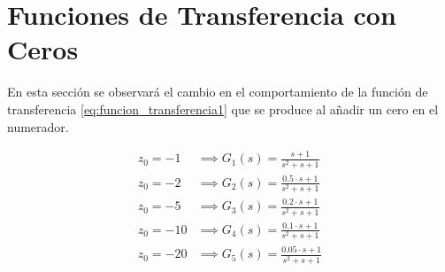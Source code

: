 \documentclass[paper=a4, fontsize=11pt]{scrreprt} %
\numberwithin{equation}{section} %
\numberwithin{figure}{section} %
\numberwithin{table}{section} %
\begin{document}
    \section{Funciones de Transferencia con Ceros}
    
    En esta sección se observará el cambio en el comportamiento de la función de transferencia \ref{eq:funcion_transferencia1} que se produce al añadir un cero en el numerador.
    
    \begin{align}
        z_0 = -1~~ &\implies G_1(s) = \frac{s + 1}{s^2 + s + 1}\\
        z_0 = -2~~ &\implies G_2(s) = \frac{0.5\cdot s + 1}{s^2 + s + 1}\\
        z_0 = -5~~ &\implies G_3(s) = \frac{0.2\cdot s + 1}{s^2 + s + 1}\\
        z_0 = -10 &\implies G_4(s) = \frac{0.1\cdot s + 1}{s^2 + s + 1}\\
        z_0 = -20 &\implies G_5(s) = \frac{0.05\cdot s + 1}{s^2 + s + 1}
    \end{align}
    
    
\end{document}
